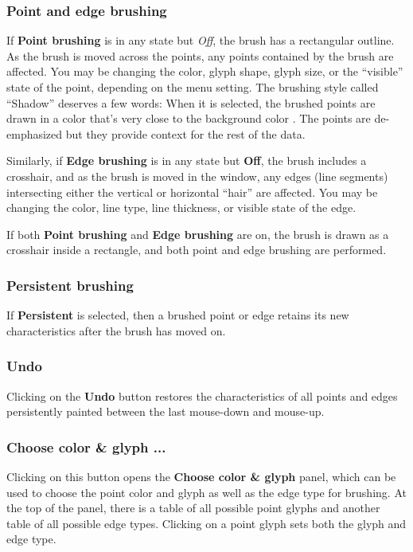 \documentclass[11pt]{article}
\def\Widget#1{\textbf{#1}}
\begin{document}
\subsubsection{Point and edge brushing}
%
If \Widget{Point brushing} is in any state but {\it Off}, the brush has a
rectangular outline.  As the brush is moved across the points, any
points contained by the brush are affected.  You may be changing the
color, glyph shape, glyph size, or the ``visible'' state of the point,
depending on the menu setting.  The brushing style called ``Shadow''
deserves a few words: When it is selected, the brushed points are
drawn in a color that's very close to the background color
\cite{BeckerCleveland87}.  The points are de-emphasized but they
provide context for the rest of the data.

Similarly, if \Widget{Edge brushing} is in any state but \Widget{Off},
the brush includes a crosshair, and as the brush is moved in the
window, any edges (line segments) intersecting either the vertical or
horizontal ``hair'' are affected.  You may be changing the color, line
type, line thickness, or visible state of the edge.

If both \Widget{Point brushing} and \Widget{Edge brushing} are on, the
brush is drawn as a crosshair inside a rectangle, and both point and
edge brushing are performed.

\subsubsection{Persistent brushing}
%
If \Widget{Persistent} is selected, then a brushed point or edge
retains its new characteristics after the brush has moved on.

\subsubsection{Undo}
%
Clicking on the \Widget{Undo} button restores the characteristics of all
points and edges persistently painted between the last mouse-down and
mouse-up.

\subsubsection{Choose color \& glyph ...}

Clicking on this button opens the \Widget{Choose color \& glyph} panel,
which can be used to choose the point color and glyph as well as the
edge type for brushing.  At the top of the panel, there is a table of
all possible point glyphs and another table of all possible edge types.
Clicking on a point glyph sets both the glyph and edge type.
\end{document}
